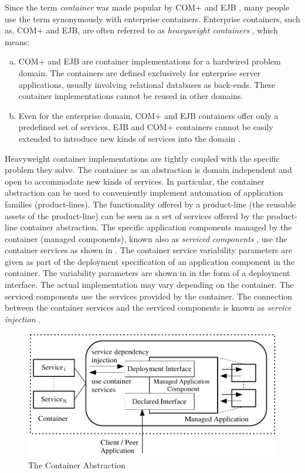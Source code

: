 Since the term \textit{container} was made popular by COM+ \cite{comp.services} and EJB \cite{j2ee14}, many people use the term synonymously with enterprise containers. Enterprise containers, such as, COM+ and EJB, are often referred to as \textit{heavyweight containers} \cite{aspectComp.03}, which means:
\begin{enumerate}[a.]
\item COM+ and EJB are container implementations for a hardwired problem domain. The containers are defined exclusively for enterprise server applications, usually involving relational databases as back-ends. These container implementations cannot be reused in other domains.
\item Even for the enterprise domain, COM+ and EJB containers offer only a predefined set of services. EJB and COM+ containers cannot be easily extended to introduce new kinds of services into the domain \cite{aspectComp.03}.
\end{enumerate}

Heavyweight container implementations are tightly coupled with the specific problem they solve. The container as an abstraction is domain independent and open to accommodate new kinds of services. In particular, the container abstraction can be used to conveniently implement automation of application families (product-lines). The functionality offered by a product-line (the reusable assets of the product-line) can be seen as a set of services offered by the product-line container abstraction. The specific application components managed by the container (managed components), known also as \textit{serviced components} \cite{com.dnet}, use the container services as shown in . The container service variability parameters are given as part of the deployment specification of an application component in the container. The variability parameters are shown in  in the form of a deployment interface. The actual implementation may vary depending on the container. The serviced components use the services provided by the container. The connection between the container services and the serviced components is known as \textit{service injection} \cite{com.dnet}.

\begin{figure}[ht]
	\begin{center}
		\includegraphics[width=12cm,height=!]{ch02/container}
	\end{center}
	\caption{The Container Abstraction}
	\label{c2fig:container}
\end{figure}

